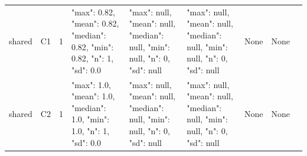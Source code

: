 \begin{tabular}{lllllllll}
shared & C1 & 1 & {"max": 0.82, "mean": 0.82, "median": 0.82, "min": 0.82, "n": 1, "sd": 0.0} & {"max": null, "mean": null, "median": null, "min": null, "n": 0, "sd": null} & {"max": null, "mean": null, "median": null, "min": null, "n": 0, "sd": null} & None & None & {} \\
shared & C2 & 1 & {"max": 1.0, "mean": 1.0, "median": 1.0, "min": 1.0, "n": 1, "sd": 0.0} & {"max": null, "mean": null, "median": null, "min": null, "n": 0, "sd": null} & {"max": null, "mean": null, "median": null, "min": null, "n": 0, "sd": null} & None & None & {} \\
\end{tabular}